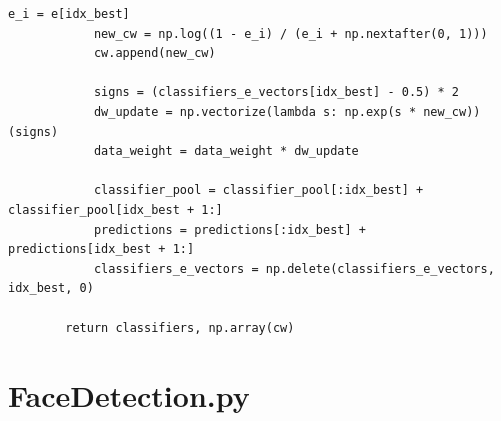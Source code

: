 \begin{lstlisting}[style=py]
            e_i = e[idx_best]
            new_cw = np.log((1 - e_i) / (e_i + np.nextafter(0, 1)))
            cw.append(new_cw)

            signs = (classifiers_e_vectors[idx_best] - 0.5) * 2
            dw_update = np.vectorize(lambda s: np.exp(s * new_cw))(signs)
            data_weight = data_weight * dw_update

            classifier_pool = classifier_pool[:idx_best] + classifier_pool[idx_best + 1:]
            predictions = predictions[:idx_best] + predictions[idx_best + 1:]
            classifiers_e_vectors = np.delete(classifiers_e_vectors, idx_best, 0)

        return classifiers, np.array(cw)

\end{lstlisting}

\section*{FaceDetection.py}

